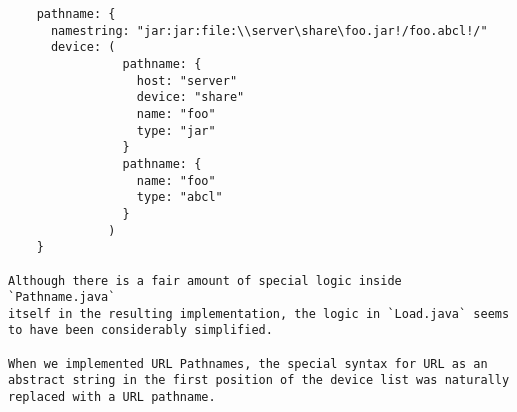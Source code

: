 \begin{verbatim}
    pathname: {
      namestring: "jar:jar:file:\\server\share\foo.jar!/foo.abcl!/"
      device: ( 
                pathname: {
                  host: "server"
                  device: "share"
                  name: "foo"
                  type: "jar"
                }
                pathname: {
                  name: "foo"
                  type: "abcl"
                }
              )
    }

Although there is a fair amount of special logic inside `Pathname.java`
itself in the resulting implementation, the logic in `Load.java` seems
to have been considerably simplified.

When we implemented URL Pathnames, the special syntax for URL as an
abstract string in the first position of the device list was naturally
replaced with a URL pathname.

\end{verbatim}
